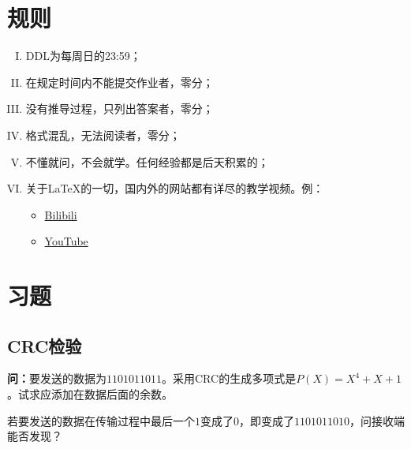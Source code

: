 \documentclass[12pt,hyperref,a4paper,UTF8]{ctexart}
\begin{document}
\cover
\thispagestyle{empty}%
\newpage


\newpage
\tableofcontents

\newpage

\section{规则}
\begin{enumerate}[I.]
    \item DDL为每周日的23:59；
    
    \item 在规定时间内不能提交作业者，零分；

    \item 没有推导过程，只列出答案者，零分；

    \item 格式混乱，无法阅读者，零分；

    \item 不懂就问，不会就学。任何经验都是后天积累的；

    \item 关于LaTeX的一切，国内外的网站都有详尽的教学视频。例：
    \begin{itemize}
        \item \href{https://www.bilibili.com/video/BV1Jy4y1p76e/?vd_source=2c0f6624843da61e86c7e8a2b75de875}{Bilibili}

        \item \href{https://www.youtube.com/watch?v=Jp0lPj2-DQA&list=PLHXZ9OQGMqxcWWkx2DMnQmj5os2X5ZR73}{YouTube}
    \end{itemize}
\end{enumerate}

\newpage

\section{习题}

\subsection{CRC检验}
\textbf{问：}要发送的数据为$1101011011$。采用CRC的生成多项式是$P(X)=X^4+X+1$。试求应添加在数据后面的余数。

若要发送的数据在传输过程中最后一个$1$变成了$0$，即变成了$1101011010$，问接收端能否发现？
\end{document}

